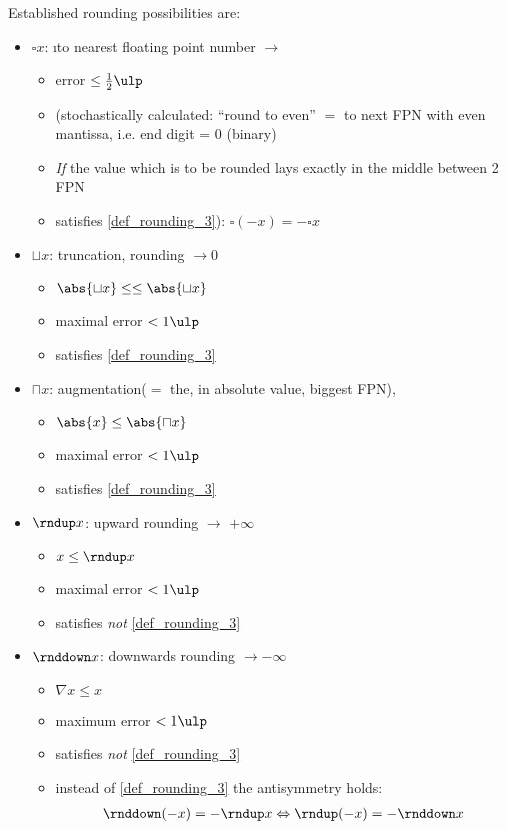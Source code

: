 	\begin{*example}
		Established rounding possibilities are:
		\begin{itemize}
			\item $\square x$: \i to nearest floating point number $\to$
			\begin{itemize}
				\item error $\le \frac{1}{2}\ulp$
				\item (stochastically calculated: ``round to even'' $=$ to next FPN with even mantissa, i.e. end digit = 0 (binary)
				\item \emph{If} the value which is to be rounded lays exactly in the middle between 2 FPN
				\item satisfies \ref{def_rounding_3}): $\square (-x)=-\square x$
			\end{itemize}
		
			\item $\sqcup x$: truncation, rounding $\to 0$
			\begin{itemize}
				\item $\abs{\sqcup x} \le \le\abs{\sqcup x}$
				\item maximal error $< 1 \ulp$
				\item satisfies \ref{def_rounding_3}
			\end{itemize}
			\item $\sqcap x$: augmentation($=$ the, in absolute value, biggest FPN), 
			\begin{itemize}
				\item $\abs{x} \le \abs{\sqcap x}$
				\item maximal error $<1 \ulp$
				\item satisfies \ref{def_rounding_3}
			\end{itemize}
			\item $\rndup x$: upward rounding $\to$ $+\infty$
			\begin{itemize}
				\item $x \le \rndup x$
				\item maximal error $< 1 \ulp$
				\item satisfies \emph{not} \ref{def_rounding_3} 
			\end{itemize}
			\item $\rnddown x$: downwards rounding $\to -\infty$
			\begin{itemize}
				\item $\nabla x\le x$
				\item maximum error $< 1 \ulp$
				\item satisfies \emph{not} \ref{def_rounding_3}
				\item instead of \ref{def_rounding_3} the antisymmetry holds:
				\begin{align*}
					\rnddown(-x)=-\rndup x \Leftrightarrow \rndup(-x) = - \rnddown x
				\end{align*}
			\end{itemize}
		\end{itemize}
	\end{*example}

